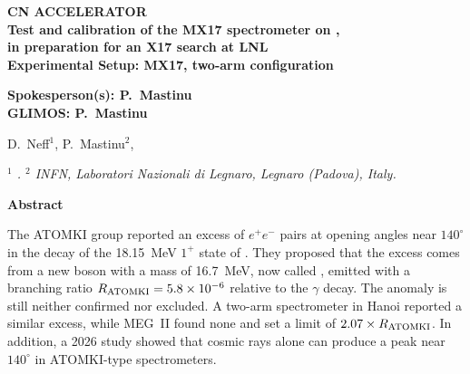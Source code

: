 \begin{center}
\begin{large}
{\bf CN ACCELERATOR}\\
\vspace{.4cm}
{\bf Test and calibration of the MX17 spectrometer on \Li\pee\Be{},\\ in preparation for an X17 search at LNL}\\
\vspace{.2cm}
{\bf Experimental Setup: MX17, two-arm configuration}
\end{large}
\vspace{.4cm}
\begin{flushleft}
{\bf Spokesperson(s): P.~Mastinu}\\
{\bf GLIMOS: P.~Mastinu}
\end{flushleft}

D.~Neff$^1$, P.~Mastinu$^2$, 
\vspace{.4cm}

\textit{\small
$^1$ . $^2$ INFN, Laboratori Nazionali di Legnaro, Legnaro (Padova), Italy.\\
}
\end{center}
\vspace{0.2cm}

\thispagestyle{empty}
\pagestyle{empty}

\begin{center}
{\bf Abstract}
\end{center}

The ATOMKI group reported an excess of $e^+e^-$ pairs at opening angles near $140^\circ$ in the decay of the
18.15~MeV $1^+$ state of \Be{}. They proposed that the excess comes from a new boson with a mass of 16.7~MeV, now called \Xs{},
emitted with a branching ratio $R_\mathrm{ATOMKI} = 5.8\times10^{-6}$ relative to the $\gamma$ decay. The anomaly is still neither
confirmed nor excluded. A two-arm spectrometer in Hanoi reported a similar excess, while MEG~II found none and set a
limit of $2.07\times R_\mathrm{ATOMKI}$. In addition, a 2026 study showed that cosmic rays alone can produce a peak near
$140^\circ$ in ATOMKI-type spectrometers.

